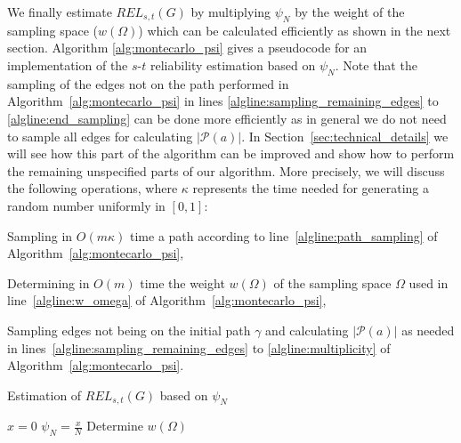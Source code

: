 \documentclass{article}
\begin{document}
We finally estimate $\mathit{REL}_{s,t}(G)$ by multiplying $\psi_N$ by
the weight of the sampling space ($w(\Omega)$) which can be calculated
efficiently as shown in the next section.  Algorithm \ref{alg:montecarlo_psi}
gives a pseudocode for an implementation of the $s$-$t$ reliability
estimation based on $\psi_N$.
Note that the sampling of the edges not on the path performed in
Algorithm~\ref{alg:montecarlo_psi} in lines
\ref{algline:sampling_remaining_edges} to \ref{algline:end_sampling} can
be done more efficiently as in general we do not need to sample all edges
for calculating $|\mathcal{P}(a)|$.
In Section~\ref{sec:technical_details} we will see how this part of the algorithm can
be improved and show how to perform the remaining unspecified parts of our algorithm.
More precisely, we will discuss the following operations, where $\kappa$ represents the
time needed for generating a random number uniformly in $[0,1]$:
\begin{compactitem}
\item Sampling in $O(m\kappa)$ time a path according to line~\ref{algline:path_sampling} of
Algorithm~\ref{alg:montecarlo_psi},
\item Determining in $O(m)$ time the weight $w(\Omega)$ of the sampling space $\Omega$ used in
line~\ref{algline:w_omega} of Algorithm~\ref{alg:montecarlo_psi},
\item Sampling edges not being on the initial path $\gamma$
and calculating $|\mathcal{P}(a)|$ as needed in
lines~\ref{algline:sampling_remaining_edges} to
\ref{algline:multiplicity} of Algorithm~\ref{alg:montecarlo_psi}.
\end{compactitem}

\linesnumbered
\begin{algorithm}[H]
\SetLine
\caption{Estimation of $\mathit{REL}_{s,t}(G)$
based on $\psi_N$\label{alg:montecarlo_psi}}
$x=0$\;
$\psi_N=\frac{x}{N}$\;
Determine $w(\Omega)$\label{algline:w_omega}\;
\end{algorithm}
\end{document}
